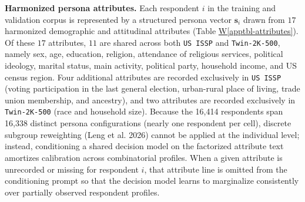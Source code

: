 \documentclass[
  letterpaper,
  DIV=11,
  numbers=noendperiod]{scrartcl}
\newcommand*\quartoapptblref[1]{Table \hyperref[#1]{W\ref{#1}}}
\begin{document}
\textbf{Harmonized persona attributes.} Each respondent \(i\) in the
training and validation corpus is represented by a structured persona
vector \(\mathbf{s}_i\) drawn from \(17\) harmonized demographic and
attitudinal attributes (\quartoapptblref{apptbl-attributes}). Of these
\(17\) attributes, \(11\) are shared across both \texttt{US\ ISSP} and
\texttt{Twin-2K-500}, namely sex, age, education, religion, attendance
of religious services, political ideology, marital status, main
activity, political party, household income, and US census region. Four
additional attributes are recorded exclusively in \texttt{US\ ISSP}
(voting participation in the last general election, urban-rural place of
living, trade union membership, and ancestry), and two attributes are
recorded exclusively in \texttt{Twin-2K-500} (race and household size).
Because the 16,414 respondents span 16,338 distinct persona
configurations (nearly one respondent per cell), discrete subgroup
reweighting (Leng et al. 2026) cannot be applied at the individual
level; instead, conditioning a shared decision model on the factorized
attribute text amortizes calibration across combinatorial profiles. When
a given attribute is unrecorded or missing for respondent \(i\), that
attribute line is omitted from the conditioning prompt so that the
decision model learns to marginalize consistently over partially
observed respondent profiles.
\end{document}
